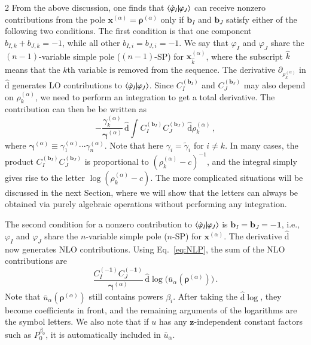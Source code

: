 \documentclass[fleqn]{2023SCGE}
\newcommand{\nds}{\hat{\mathrm{d}}}
\begin{document}
\begin{multicols}{2}
From the above discussion, one finds that $\braket{\dot{\varphi}_I|\varphi_J}$ can receive nonzero contributions from the pole $\bm{x}^{(\alpha)}=\bm{\rho}^{(\alpha)}$ only if $\bm{b}_I$ and $\bm{b}_J$ satisfy either of the following two conditions.  The first condition is that one component $b_{I,k}+b_{J,k}=-1$, while all other $b_{I,i}=b_{J,i}=-1$. We say that $\varphi_I$ and $\varphi_J$ share the $(n-1)$-variable simple pole ($(n-1)$-SP) for $\bm{x}^{(\alpha)}_{\hat{k}}$, where the subscript $\hat{k}$ means that the $k$th variable is removed from the sequence. The derivative $\partial_{\rho^{(\alpha)}_k}$ in $\nds$ generates LO contributions to $\braket{\dot{\varphi}_I|\varphi_J}$.
{  Since $C_I^{(\bm{b}_I)}$ and $C_J^{(\bm{b}_J)}$ may also depend on $\rho^{(\alpha)}_k$, we need to perform an integration to get a total derivative. The contribution can then be be written as}
\begin{equation}
    -{\frac{{\gamma}^{(\alpha)}_k }{\bm{{\gamma}}^{(\alpha)}}} \, \nds \int C_I^{(\bm{b}_I)}C_J^{(\bm{b}_J)} \, \nds \rho^{(\alpha)}_k \,,
    \label{eq:NMCSPdlog}
\end{equation}
where $\bm{\gamma}^{(\alpha)} \equiv \gamma^{(\alpha)}_1 \cdots \gamma^{(\alpha)}_n$. {  Note that here $\gamma_i = \tilde{\gamma}_i$ for $i \neq k$.} In many cases, the product $C_I^{(\bm{b}_I)}C_J^{(\bm{b}_J)}$ is proportional to $(\rho^{(\alpha)}_k-c)^{-1}$, and the integral simply gives rise to the letter $\log(\rho^{(\alpha)}_k-c)$. The more complicated situations will be discussed in the next Section, where we will show that the letters can always be obtained via purely algebraic operations without performing any integration.

The second condition for a nonzero contribution to  $\braket{\dot{\varphi}_I|\varphi_J}$ is $\bm{b}_I=\bm{b}_J=\bm{-1}$, i.e., $\varphi_I$ and $\varphi_J$ share the $n$-variable simple pole ($n$-SP) for $\bm{x}^{(\alpha)}$. The derivative $\nds$ now generates NLO contributions. Using Eq.~\eqref{eq:NLP}, the sum of the NLO contributions are
\begin{equation}
	\frac{C_I^{(\bm{-1})} C_J^{(\bm{-1})}}{\bm{\gamma}^{(\alpha)}} \, \nds \log \Big( \bar{u}_\alpha(\bm{\rho}^{(\alpha)}) \Big) \,.  \label{eq:CSPdlog}
\end{equation}
Note that $\bar{u}_\alpha(\bm{\rho}^{(\alpha)})$ still contains powers $\beta_i$. After taking the $\nds\log$, they become coefficients in front, and the remaining arguments of the logarithms are the symbol letters. We also note that if $u$ has any $\bm{z}$-independent constant factors such as $P_0^{\beta_0}$, it is automatically included in $\bar{u}_\alpha$.


\end{multicols}
\end{document}
